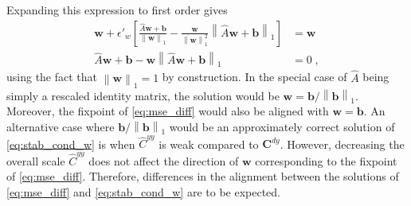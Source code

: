\documentclass[10pt,a4paper,draft]{article}
\begin{document}
Expanding this expression to first order gives
\begin{align}
	\mathbf{w} + \epsilon'_w \left[\frac{\widehat{A}\mathbf{w} + \mathbf{b}}{\left\lVert \mathbf{w} \right\rVert_1} - \frac{\mathbf{w}}{\left\lVert \mathbf{w} \right\rVert_1^2}\left\lVert \widehat{A}\mathbf{w} + \mathbf{b}\right\rVert_1\right] &= \mathbf{w} \\
	\widehat{A}\mathbf{w} + \mathbf{b} - \mathbf{w}\left\lVert \widehat{A}\mathbf{w} + \mathbf{b}\right\rVert_1 &= 0 \; ,
\end{align}
using the fact that $\left\lVert \mathbf{w} \right\rVert_1 = 1$ by construction. In the special case of $\widehat{A}$ being simply a rescaled identity matrix, the solution would be $\mathbf{w} = \mathbf{b} / \left\lVert \mathbf{b} \right\rVert_1$. Moreover, the fixpoint of \eqref{eq:mse_diff} would also be aligned with $\mathbf{w} = \mathbf{b}$. An alternative case where $\mathbf{b} / \left\lVert \mathbf{b} \right\rVert_1$ would be an approximately correct solution of \eqref{eq:stab_cond_w} is when $\widehat{C}^{yy}$ is weak compared to $\mathbf{C}^{dy}$. However, decreasing the overall scale $\widehat{C}^{yy}$ does not affect the direction of $\mathbf{w}$ corresponding to the fixpoint of \eqref{eq:mse_diff}. Therefore, differences in the alignment between the solutions of \eqref{eq:mse_diff} and \eqref{eq:stab_cond_w} are to be expected.
\end{document}
